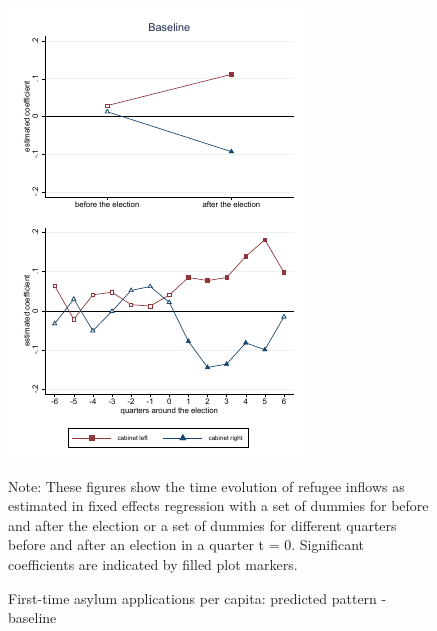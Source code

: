 \documentclass[11pt,a4paper]{scrartcl}
\begin{document}
\clearpage
\FloatBarrier


\clearpage
\FloatBarrier
\begin{figure}[!ht]
	
	\caption{First-time asylum applications per capita: predicted pattern - baseline}
	\centering
	\begin{minipage}{0.8\textwidth} 
		\includegraphics[width=\linewidth]{../results/applications/app_graphs_baseline.pdf}
		{\scriptsize Note: These figures show the time evolution of refugee inflows as estimated in fixed effects regression with a set of dummies for before and after the election or a set of dummies for different quarters before and after an election in a quarter t = 0. Significant coefficients are indicated by filled plot markers.\par}
	\end{minipage}
\end{figure}
\end{document}
